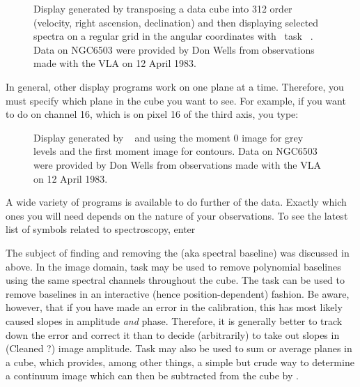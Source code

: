 \begin{figure}
\centering
\caption[{\tt PLCUB} display of spectra from a cube]{ Display
generated by transposing a data cube into 312 order (velocity, right
ascension, declination) and then displaying selected spectra on a
regular grid in the angular coordinates with \AIPS\ task {\tt
{}}\@.  Data on NGC6503 were provided by Don Wells from
observations made with the VLA on 12 April 1983.}
\label{fig:linespect}
\end{figure}

    In general, other display programs work on one plane at a time.
Therefore, you must specify which plane in the cube you want to see.
For example, if you want to do {\tt {}} on channel 16, which
is on pixel 16 of the third axis, you type:

\vfill\eject
{}

\begin{figure}
\centering
\caption[Images of line-cube moments.]{Display generated by {\tt
{}} and {\tt {}} using the moment 0 image for grey
levels and the first moment image for contours.  Data on NGC6503 were
provided by Don Wells from observations made with the VLA on 12 April
1983. }
\label{fig:linemom}
\end{figure}

     A wide variety of programs is available to do further
 of the data.   Exactly which ones you will need
depends on the nature of your observations.  To see the latest list of
symbols related to spectroscopy, enter

    The subject of finding and removing the  (aka
spectral baseline) was discussed in  above.  In the
image domain, task {\tt {}} may be used to remove polynomial
baselines using the same spectral channels throughout the cube.  The
task {\tt {}} can be used to remove baselines in an
interactive (hence position-dependent) fashion. Be aware, however,
that if you have made an error in the calibration, this has most
likely caused slopes in amplitude {\it and\/} phase.  Therefore, it is
generally better to track down the error and correct it than to decide
(arbitrarily) to take out slopes in (Cleaned ?) image amplitude.  Task
{\tt {}} may also be used to sum or average planes in a
cube, which provides, among other things, a simple but crude way to
determine a continuum image which can then be subtracted from the cube
by {\tt {}}\@.

